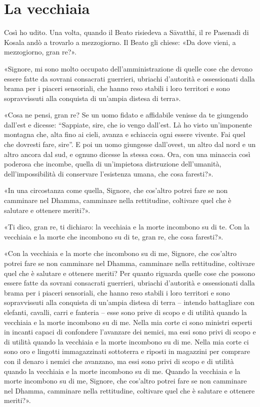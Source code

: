 \chapter{La vecchiaia}

 Così ho udito. Una volta, quando il Beato risiedeva a
Sāvatthī, il re Pasenadi di Kosala andò a trovarlo a mezzogiorno. Il
Beato gli chiese: «Da dove vieni, a mezzogiorno, gran re?».


«Signore, mi sono molto occupato dell’amministrazione di quelle cose che
devono essere fatte da sovrani consacrati guerrieri, ubriachi d’autorità
e ossessionati dalla brama per i piaceri sensoriali, che hanno reso
stabili i loro territori e sono sopravvissuti alla conquista di un’ampia
distesa di terra».


«Cosa ne pensi, gran re? Se un uomo fidato e affidabile venisse da te
giungendo dall’est e dicesse: “Sappiate, sire, che io vengo dall’est. Là
ho visto un’imponente montagna che, alta fino ai cieli, avanza e
schiaccia ogni essere vivente. Fai quel che dovresti fare, sire”. E poi
un uomo giungesse dall’ovest, un altro dal nord e un altro ancora dal
sud, e ognuno dicesse la stessa cosa. Ora, con una minaccia così
poderosa che incombe, quella di un’impietosa distruzione dell’umanità,
dell’impossibilità di conservare l’esistenza umana, che cosa faresti?».


«In una circostanza come quella, Signore, che cos’altro potrei fare se
non camminare nel Dhamma, camminare nella rettitudine, coltivare quel
che è salutare e ottenere meriti?».


«Ti dico, gran re, ti dichiaro: la vecchiaia e la morte incombono su di
te. Con la vecchiaia e la morte che incombono su di te, gran re, che
cosa faresti?».


«Con la vecchiaia e la morte che incombono su di me, Signore, che
cos’altro potrei fare se non camminare nel Dhamma, camminare nella
rettitudine, coltivare quel che è salutare e ottenere meriti? Per quanto
riguarda quelle cose che possono essere fatte da sovrani consacrati
guerrieri, ubriachi d’autorità e ossessionati dalla brama per i piaceri
sensoriali, che hanno reso stabili i loro territori e sono sopravvissuti
alla conquista di un’ampia distesa di terra – intendo battagliare con
elefanti, cavalli, carri e fanteria – esse sono prive di scopo e di
utilità quando la vecchiaia e la morte incombono su di me. Nella mia
corte ci sono ministri esperti in incanti capaci di confondere
l’avanzare dei nemici, ma essi sono privi di scopo e di utilità quando
la vecchiaia e la morte incombono su di me. Nella mia corte ci sono oro
e lingotti immagazzinati sottoterra e riposti in magazzini per comprare
con il denaro i nemici che avanzano, ma essi sono privi di scopo e di
utilità quando la vecchiaia e la morte incombono su di me. Quando la
vecchiaia e la morte incombono su di me, Signore, che cos’altro potrei
fare se non camminare nel Dhamma, camminare nella rettitudine, coltivare
quel che è salutare e ottenere meriti?».


